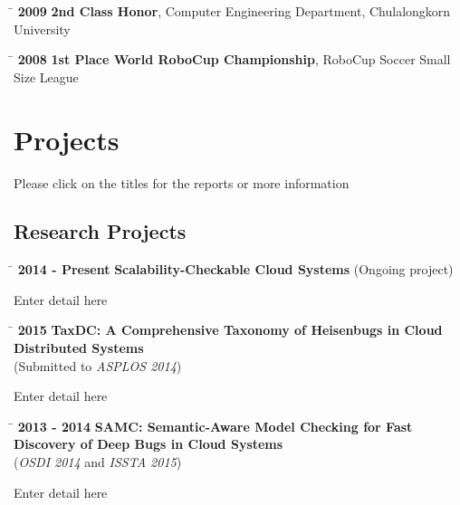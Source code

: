 \documentclass[10pt]{article} %
\begin{document}
\begin{tabbing}
\hspace{2.5cm} \= \kill
\textbf{2009} \> \textbf{2nd Class Honor}, Computer Engineering Department, Chulalongkorn University
\end{tabbing}

\begin{tabbing}
\hspace{2.5cm} \= \kill
\textbf{2008} \> \textbf{1st Place World RoboCup Championship}, RoboCup Soccer Small Size League
\end{tabbing}



\section{Projects}
\vspace{-4mm}
{\footnotesize Please click on the titles for the reports or more information}

\subsection{Research Projects}

\begin{tabbing}
\hspace{2.5cm} \= \kill
\textbf{2014 - Present} \>\+ \textbf{Scalability-Checkable Cloud Systems} (Ongoing project) \\
\begin{minipage}{\smallertextwidth}
Enter detail here
\end{minipage}
\end{tabbing}

\begin{tabbing}
\hspace{2.5cm} \= \kill
\textbf{2015} \> \textbf{TaxDC: A Comprehensive Taxonomy of Heisenbugs in Cloud Distributed Systems} \\
\>\+ (Submitted to \textit{ASPLOS 2014}) \\
\begin{minipage}{\smallertextwidth}
Enter detail here
\end{minipage}
\end{tabbing}

\begin{tabbing}
\hspace{2.5cm} \= \kill
\textbf{2013 - 2014} \> \textbf{SAMC: Semantic-Aware Model Checking for Fast Discovery of Deep Bugs in Cloud Systems} \\
\>\+ (\textit{OSDI 2014} and \textit{ISSTA 2015}) \\
\begin{minipage}{\smallertextwidth}
Enter detail here
\end{minipage}
\end{tabbing}
\end{document}
